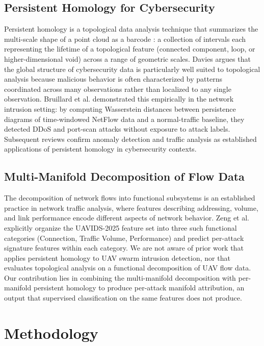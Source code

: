 \documentclass[conf]{new-aiaa}
\begin{document}
\subsection{Persistent Homology for Cybersecurity}

Persistent homology is a topological data analysis technique that summarizes the multi-scale shape of a point cloud as a barcode \cite{Ghrist}: a collection of intervals each representing the lifetime of a topological feature (connected component, loop, or higher-dimensional void) across a range of geometric scales. Davies \cite{Davies} argues that the global structure of cybersecurity data is particularly well suited to topological analysis because malicious behavior is often characterized by patterns coordinated across many observations rather than localized to any single observation. Bruillard et al. \cite{Bruillard} demonstrated this empirically in the network intrusion setting: by computing Wasserstein distances between persistence diagrams of time-windowed NetFlow data and a normal-traffic baseline, they detected DDoS and port-scan attacks without exposure to attack labels. Subsequent reviews \cite{Davies, Eroglu} confirm anomaly detection and traffic analysis as established applications of persistent homology in cybersecurity contexts.

\subsection{Multi-Manifold Decomposition of Flow Data}

The decomposition of network flows into functional subsystems is an established practice in network traffic analysis, where features describing addressing, volume, and link performance encode different aspects of network behavior. Zeng et al. \cite{Zeng} explicitly organize the UAVIDS-2025 feature set into three such functional categories (Connection, Traffic Volume, Performance) and predict per-attack signature features within each category. We are not aware of prior work that applies persistent homology to UAV swarm intrusion detection, nor that evaluates topological analysis on a functional decomposition of UAV flow data. Our contribution lies in combining the multi-manifold decomposition with per-manifold persistent homology to produce per-attack manifold attribution, an output that supervised classification on the same features does not produce.

\section{Methodology}
\label{sec:method}
\end{document}
